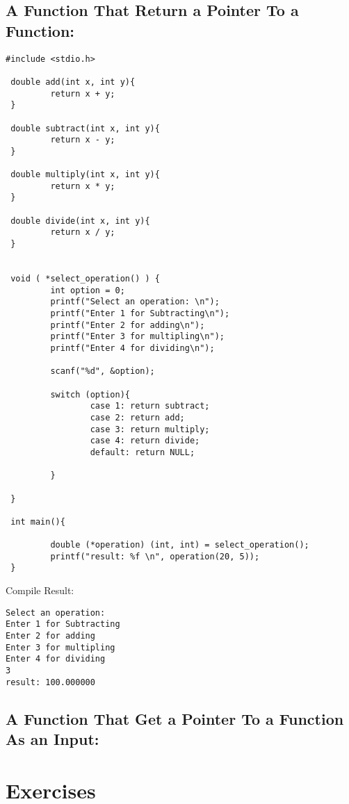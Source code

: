 \subsection{A Function That Return a Pointer To a Function:}
\begin{lstlisting} 
#include <stdio.h>

 double add(int x, int y){
         return x + y;
 }

 double subtract(int x, int y){
         return x - y;
 }

 double multiply(int x, int y){
         return x * y;
 }

 double divide(int x, int y){
         return x / y;
 }


 void ( *select_operation() ) {
         int option = 0;
         printf("Select an operation: \n");
         printf("Enter 1 for Subtracting\n");
         printf("Enter 2 for adding\n");
         printf("Enter 3 for multipling\n");
         printf("Enter 4 for dividing\n");

         scanf("%d", &option);

         switch (option){
                 case 1: return subtract;
                 case 2: return add;
                 case 3: return multiply;
                 case 4: return divide;
                 default: return NULL;

         }

 }

 int main(){

         double (*operation) (int, int) = select_operation();
         printf("result: %f \n", operation(20, 5));
 }
\end{lstlisting}
Compile Result:
\begin{lstlisting} 
Select an operation:
Enter 1 for Subtracting
Enter 2 for adding
Enter 3 for multipling
Enter 4 for dividing
3
result: 100.000000
\end{lstlisting}

\subsection{A Function That Get a Pointer To a Function As an Input:}
\section{Exercises}